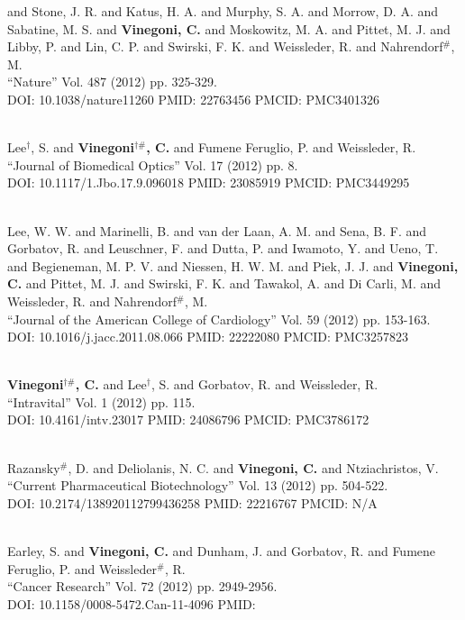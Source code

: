 and Stone, J. R. and Katus, H. A. and Murphy, S. A. and Morrow, D. A. and Sabatine, M. S. and {\bf Vinegoni, C.} and Moskowitz, M. A. and Pittet, M. J. and Libby, P. and Lin, C. P. and Swirski, F. K. and Weissleder, R. and Nahrendorf$^\#$, M. \\ ``Nature'' Vol. 487 (2012) pp. 325-329. \\ DOI: 10.1038/nature11260 PMID: 22763456 PMCID: PMC3401326\item {} \\ Lee$^\dag$, S. and {\bf Vinegoni$^{\dag \#}$, C.} and Fumene Feruglio, P. and Weissleder, R. \\ ``Journal of Biomedical Optics'' Vol. 17 (2012) pp. 8. \\ DOI: 10.1117/1.Jbo.17.9.096018 PMID: 23085919 PMCID: PMC3449295\item {} \\ Lee, W. W. and Marinelli, B. and van der Laan, A. M. and Sena, B. F. and Gorbatov, R. and Leuschner, F. and Dutta, P. and Iwamoto, Y. and Ueno, T. and Begieneman, M. P. V. and Niessen, H. W. M. and Piek, J. J. and {\bf Vinegoni, C.} and Pittet, M. J. and Swirski, F. K. and Tawakol, A. and Di Carli, M. and Weissleder, R. and Nahrendorf$^\#$, M. \\ ``Journal of the American College of Cardiology'' Vol. 59 (2012) pp. 153-163. \\ DOI: 10.1016/j.jacc.2011.08.066 PMID: 22222080 PMCID: PMC3257823\item {} \\ {\bf Vinegoni$^{\dag \#}$, C.} and Lee$^\dag$, S. and Gorbatov, R. and Weissleder, R. \\ ``Intravital'' Vol. 1 (2012) pp. 115. \\ DOI: 10.4161/intv.23017 PMID: 24086796 PMCID: PMC3786172\item {} \\ Razansky$^\#$, D. and Deliolanis, N. C. and {\bf Vinegoni, C.} and Ntziachristos, V. \\ ``Current Pharmaceutical Biotechnology'' Vol. 13 (2012) pp. 504-522. \\ DOI: 10.2174/138920112799436258 PMID: 22216767 PMCID: N/A\item {} \\ Earley, S. and {\bf Vinegoni, C.} and Dunham, J. and Gorbatov, R. and Fumene Feruglio, P. and Weissleder$^\#$, R. \\ ``Cancer Research'' Vol. 72 (2012) pp. 2949-2956. \\ DOI: 10.1158/0008-5472.Can-11-4096 PMID: 